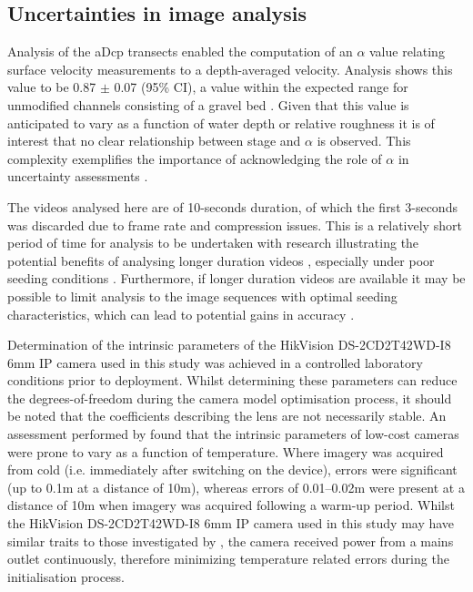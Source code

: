 \documentclass[hess, manuscript]{copernicus} %
\begin{document}
\subsection{Uncertainties in image analysis}
\label{Discussion: image uncertainty}
Analysis of the aDcp transects enabled the computation of an $\alpha$ value relating surface velocity measurements to a depth-averaged velocity. Analysis shows this value to be 0.87 $\pm$ 0.07 (95\% CI), a value within the expected range for unmodified channels consisting of a gravel bed \citep{turnipseed2010discharge}. Given that this value is anticipated to vary as a function of water depth or relative roughness it is of interest that no clear relationship between stage and $\alpha$ is observed. This complexity exemplifies the importance of acknowledging the role of $\alpha$ in uncertainty assessments \citep{hauet2018velocity}.

The videos analysed here are of 10-seconds duration, of which the first 3-seconds was discarded due to frame rate and compression issues. This is a relatively short period of time for analysis to be undertaken with research illustrating the potential benefits of analysing longer duration videos \citep{pumo2021optical}, especially under poor seeding conditions \citep{dal2018exploring}. Furthermore, if longer duration videos are available it may be possible to limit analysis to the image sequences with optimal seeding characteristics, which can lead to potential gains in accuracy \citep{pizarro2020refining, pizarro2020}.

Determination of the intrinsic parameters of the HikVision DS-2CD2T42WD-I8 6mm IP camera used in this study was achieved in a controlled laboratory conditions prior to deployment. Whilst determining these parameters can reduce the degrees-of-freedom during the camera model optimisation process, it should be noted that the coefficients describing the lens are not necessarily stable. An assessment performed by \cite{elias2020} found that the intrinsic parameters of low-cost cameras were prone to vary as a function of temperature. Where imagery was acquired from cold (i.e. immediately after switching on the device), errors were significant (up to 0.1m at a distance of 10m), whereas errors of 0.01--0.02m were present at a distance of 10m when imagery was acquired following a warm-up period. Whilst the HikVision DS-2CD2T42WD-I8 6mm IP camera used in this study may have similar traits to those investigated by \cite{elias2020}, the camera received power from a mains outlet continuously, therefore minimizing temperature related errors during the initialisation process. 
\end{document}
